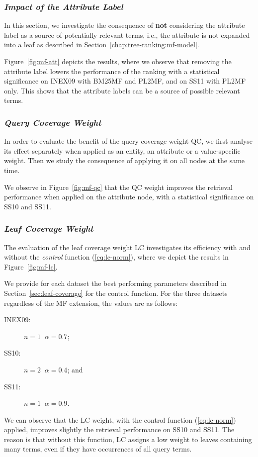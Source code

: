 \subsubsection{\emph{Impact of the Attribute Label}}
\label{sec:with-att}

In this section, we investigate the consequence of \textbf{not} considering the attribute label as a source of potentially relevant terms, i.e., the attribute is not expanded into a leaf as described in Section~\ref{chap:tree-ranking:mf-model}.

Figure~\ref{fig:mf-att} depicts the results, where we observe that removing the attribute label lowers the performance of the ranking with a statistical significance on INEX09 with BM25MF and PL2MF, and on SS11 with PL2MF only. This shows that the attribute labels can be a source of possible relevant terms.

\subsubsection{\emph{Query Coverage Weight}}
\label{sec:qc-weight-effect}

In order to evaluate the benefit of the query coverage weight QC, we first analyse its effect separately when applied as an entity, an attribute or a value-specific weight. Then we study the consequence of applying it on all nodes at the same time.

We observe in Figure~\ref{fig:mf-qc} that the QC weight improves the retrieval performance when applied on the attribute node, with a statistical significance on SS10 and SS11.

\subsubsection{\emph{Leaf Coverage Weight}}
\label{sec:lc-weight-effect}

The evaluation of the leaf coverage weight LC investigates its efficiency with and without the \emph{control} function (\ref{eq:lc-norm}), where we depict the results in Figure~\ref{fig:mf-lc}.

We provide for each dataset the best performing parameters described in Section~\ref{sec:leaf-coverage} for the control function. For the three datasets regardless of the MF extension, the values are as follows:
\begin{description}
	\item[INEX09:] $n=1\;\;\alpha=0.7$;
	\item[SS10:] $n=2\;\;\alpha=0.4$; and
	\item[SS11:] $n=1\;\;\alpha=0.9$.
\end{description}
We can observe that the LC weight, with the control function (\ref{eq:lc-norm}) applied, improves slightly the retrieval performance on SS10 and SS11. The reason is that without this function, LC assigns a low weight to leaves containing many terms, even if they have occurrences of all query terms.

